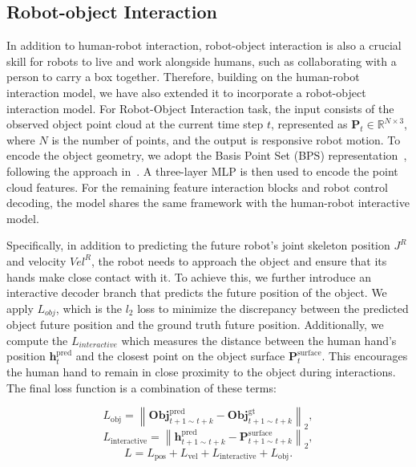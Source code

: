 \subsection{Robot-object Interaction}
In addition to human-robot interaction, robot-object interaction is also a crucial skill for robots to live and work alongside humans, such as collaborating with a person to carry a box together. Therefore, building on the human-robot interaction model, we have also extended it to incorporate a robot-object interaction model. For Robot-Object Interaction task, the input consists of the observed object point cloud at the current time step \( t \), represented as \( \mathbf{P}_t \in \mathbb{R}^{N \times 3} \), where \( N \) is the number of points, and the output is responsive robot motion. To encode the object geometry, we adopt the Basis Point Set (BPS) representation~\cite{prokudin2019efficient}, following the approach in~\cite{li2023object}. A three-layer MLP is then used to encode the point cloud features.
For the remaining feature interaction blocks and robot control decoding, the model shares the same framework with the human-robot interactive model. 

Specifically, in addition to predicting the future robot's joint skeleton position \( J^R \) and velocity \( Vel^R \), the robot needs to approach the object and ensure that its hands make close contact with it. To achieve this, we further introduce an interactive decoder branch that predicts the future position of the object. We apply $L_{obj}$, which is the $l_2$ loss to minimize the discrepancy between the predicted object future position and the ground truth future position. Additionally, we compute the $L_{interactive}$  which measures the distance between the human hand's position $\mathbf{h}_t^{\text{pred}}$ and the closest point on the object surface $\mathbf{P}_t^{\text{surface}}$. This encourages the human hand to remain in close proximity to the object during interactions. The final loss function is a combination of these terms:

$$
L_{\text{obj}} = \left\| \mathbf{Obj}_{t+1 \sim t+k}^{\text{pred}} - \mathbf{Obj}_{t+1 \sim t+k}^{\text{gt}} \right\|_2,
$$
$$
L_{\text{interactive}} = \left\| \mathbf{h}_{t+1 \sim t+k}^{\text{pred}} - \mathbf{P}_{t+1 \sim t+k}^{\text{surface}} \right\|_2,
$$
$$
L = L_{\text{pos}} + L_{\text{vel}} + L_{\text{interactive}} + L_{\text{obj}}.
$$





